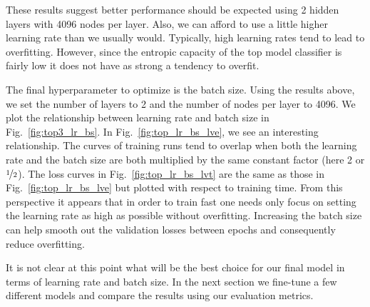 \documentclass[12pt,journal,compsoc]{IEEEtran}
\begin{document}
These results suggest better performance should be expected using 2 hidden layers with 4096 nodes per layer. Also, we can afford to use a little higher learning rate than we usually would. Typically, high learning rates tend to lead to overfitting. However, since the entropic capacity of the top model classifier is fairly low it does not have as strong a tendency to overfit.

The final hyperparameter to optimize is the batch size. Using the results above, we set the number of layers to 2 and the number of nodes per layer to 4096. We plot the relationship between learning rate and batch size in Fig.~\ref{fig:top3_lr_bs}. In Fig.~\ref{fig:top_lr_bs_lve}, we see an interesting relationship.  The curves of training runs tend to overlap when both the learning rate and the batch size are both multiplied by the same constant factor (here 2 or $\nicefrac{1}{2}$). The loss curves in Fig.~\ref{fig:top_lr_bs_lvt} are the same as those in Fig.~\ref{fig:top_lr_bs_lve} but plotted with respect to training time. From this perspective it appears that in order to train fast one needs only focus on setting the learning rate as high as possible without overfitting. Increasing the batch size can help smooth out the validation losses between epochs and consequently reduce overfitting.


It is not clear at this point what will be the best choice for our final model in terms of learning rate and batch size. In the next section we fine-tune a few different models and compare the results using our evaluation metrics. 



\end{document}
